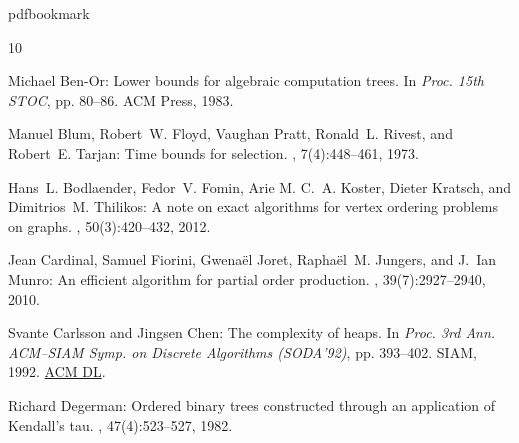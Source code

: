 \newcommand{\prelim}{Preliminary version in\ }\newcommand{\prelims}{Preliminary
  versions in\ }
\providecommand{\bibhead}[1]{}
\expandafter\ifx\csname pdfbookmark\endcsname\relax%
  \providecommand{\tocrefpdfbookmark}{}
\else\providecommand{\tocrefpdfbookmark}{%
   \hypertarget{tocreferences}{}%
   \pdfbookmark[1]{References}{tocreferences}}%
\fi

\tocrefpdfbookmark
\begin{thebibliography}{10}

\bibhead{Ben-Or1983}
{\sc Michael Ben-Or}: Lower bounds for algebraic computation trees.
\newblock In {\em Proc. 15th STOC}, pp. 80--86. ACM Press, 1983.
\newblock [\epfmtdoi{10.1145/800061.808735}]

\bibhead{BFPRT1973}
{\sc Manuel Blum, Robert~W. Floyd, Vaughan Pratt, Ronald~L. Rivest, and
  Robert~E. Tarjan}: Time bounds for selection.
, 7(4):448--461, 1973.
\newblock [\epfmtdoi{10.1016/S0022-0000(73)80033-9}]

\bibhead{Bodlaender2011}
{\sc Hans~L. Bodlaender, Fedor~V. Fomin, Arie M. C.~A. Koster, Dieter Kratsch,
  and Dimitrios~M. Thilikos}: A note on exact algorithms for vertex ordering
  problems on graphs.
, 50(3):420--432, 2012.
\newblock [\epfmtdoi{10.1007/s00224-011-9312-0}]

\bibhead{CFJJM2008}
{\sc Jean Cardinal, Samuel Fiorini, Gwena\"{e}l Joret, Rapha\"{e}l~M. Jungers,
  and J.~Ian Munro}: An efficient algorithm for partial order production.
, 39(7):2927--2940, 2010.
\newblock [\epfmtdoi{10.1137/090759860}]

\bibhead{CC92}
{\sc Svante Carlsson and Jingsen Chen}: The complexity of heaps.
\newblock In {\em Proc. 3rd Ann. ACM--SIAM Symp. on Discrete Algorithms
  (SODA'92)}, pp. 393--402. SIAM, 1992.
\newblock \href{https://dl.acm.org/doi/10.5555/139404.139483}{ACM DL}.

\bibhead{Degerman1982}
{\sc Richard Degerman}: Ordered binary trees constructed through an application
  of {K}endall's tau.
, 47(4):523--527, 1982.
\newblock [\epfmtdoi{10.1007/BF02293713}]


\end{thebibliography}
